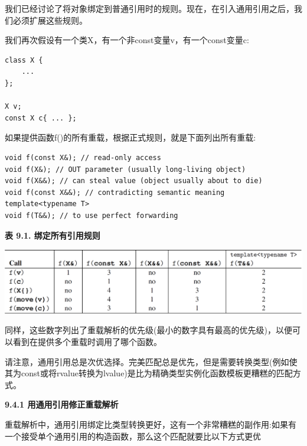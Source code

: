 我们已经讨论了将对象绑定到普通引用时的规则。现在，在引入通用引用之后，我们必须扩展这些规则。\par

我们再次假设有一个类X，有一个非const变量v，有一个const变量c:\par

\begin{lstlisting}[caption={}]
class X {
	...
};

X v;
const X c{ ... };
\end{lstlisting}

如果提供函数f()的所有重载，根据正式规则，就是下面列出所有重载:\par

\begin{lstlisting}[caption={}]
void f(const X&); // read-only access
void f(X&); // OUT parameter (usually long-living object)
void f(X&&); // can steal value (object usually about to die)
void f(const X&&); // contradicting semantic meaning
template<typename T>
void f(T&&); // to use perfect forwarding
\end{lstlisting}

\hspace*{\fill} \par %
\textbf{表 9.1. 绑定所有引用规则}
\begin{center}
	\includegraphics[width=1.0\textwidth]{content/2/chapter9/images/1}
\end{center}

同样，这些数字列出了重载解析的优先级(最小的数字具有最高的优先级)，以便可以看到在提供多个重载时调用了哪个函数。\par

请注意，通用引用总是次优选择。完美匹配总是优先，但是需要转换类型(例如使其为const或将rvalue转换为lvalue)是比为精确类型实例化函数模板更糟糕的匹配方式。\par

\hspace*{\fill} \par %
\textbf{9.4.1 用通用引用修正重载解析}

重载解析中，通用引用绑定比类型转换更好，这有一个非常糟糕的副作用:如果有一个接受单个通用引用的构造函数，那么这个匹配就要比以下方式更优\par

